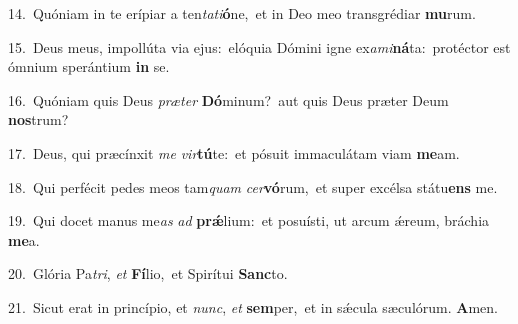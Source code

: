 {\numbfont\textcolor{\numbcolor}{14.}}~Quóniam in te erípiar a ten\-\textit{ta}\-\textit{ti}\textbf{ó}ne,~\star et in Deo meo transgrédiar \textbf{mu}\-rum.\par
{\numbfont\textcolor{\numbcolor}{15.}}~Deus meus, impollúta via ejus:~\dagger elóquia Dómini igne ex\-\textit{a}\-\textit{mi}\textbf{ná}ta:~\star protéctor est ómnium sperántium \textbf{in} se.\par
{\numbfont\textcolor{\numbcolor}{16.}}~Quóniam quis Deus \textit{præ}\-\textit{ter} \textbf{Dó}\-minum?~\star aut quis Deus præter Deum \textbf{nos}\-trum?\par
{\numbfont\textcolor{\numbcolor}{17.}}~Deus, qui præcínxit \textit{me} \textit{vir}\-\textbf{tú}te:~\star et pósuit immaculátam viam \textbf{me}\-am.\par
{\numbfont\textcolor{\numbcolor}{18.}}~Qui perfécit pedes meos tam\textit{quam} \textit{cer}\-\textbf{vó}rum,~\star et super excélsa státu\textbf{ens} me.\par
{\numbfont\textcolor{\numbcolor}{19.}}~Qui docet manus me\textit{as} \textit{ad} \textbf{prǽ}\-lium:~\star et posuísti, ut arcum ǽreum, bráchia \textbf{me}\-a.\par
{\numbfont\textcolor{\numbcolor}{20.}}~Glória Pa\-\textit{tri}\-, \textit{et} \textbf{Fí}\-lio,~\star et Spirítui \textbf{Sanc}\-to.\par
{\numbfont\textcolor{\numbcolor}{21.}}~Sicut erat in princípio, et \textit{nunc}\-, \textit{et} \textbf{sem}\-per,~\star et in sǽcula sæculórum. \textbf{A}\-men.\par
